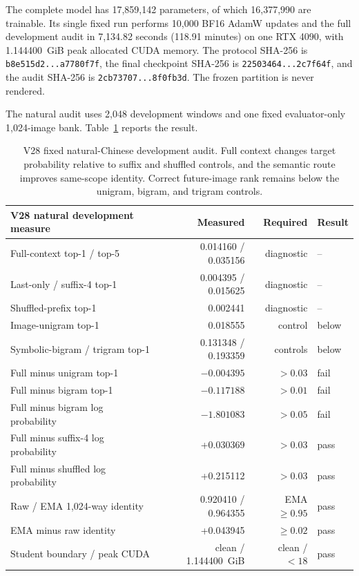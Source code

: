 \documentclass[11pt]{article}
\begin{document}
The complete model has 17,859,142 parameters, of which 16,377,990 are
trainable. Its single fixed run performs 10,000 BF16 AdamW updates and the full
development audit in 7,134.82 seconds (118.91 minutes) on one RTX 4090, with
1.144400~GiB peak allocated CUDA memory. The protocol SHA-256 is
\texttt{b8e515d2...a7780f7f}, the final checkpoint SHA-256 is
\texttt{22503464...2c7f64f}, and the audit SHA-256 is
\texttt{2cb73707...8f0fb3d}. The frozen partition is never rendered.

The natural audit uses 2,048 development windows and one fixed evaluator-only
1,024-image bank. Table~\ref{tab:v28natural} reports the result.

\begin{table}[h!]
\centering
\small
\begin{tabular}{lrrl}
\toprule
V28 natural development measure & Measured & Required & Result \\
\midrule
Full-context top-1 / top-5 & 0.014160 / 0.035156 & diagnostic & -- \\
Last-only / suffix-4 top-1 & 0.004395 / 0.015625 & diagnostic & -- \\
Shuffled-prefix top-1 & 0.002441 & diagnostic & -- \\
Image-unigram top-1 & 0.018555 & control & below \\
Symbolic-bigram / trigram top-1 & 0.131348 / 0.193359 & controls & below \\
Full minus unigram top-1 & $-0.004395$ & $>0.03$ & fail \\
Full minus bigram top-1 & $-0.117188$ & $>0.01$ & fail \\
Full minus bigram log probability & $-1.801083$ & $>0.05$ & fail \\
Full minus suffix-4 log probability & +0.030369 & $>0.03$ & pass \\
Full minus shuffled log probability & +0.215112 & $>0.03$ & pass \\
Raw / EMA 1,024-way identity & 0.920410 / 0.964355 & EMA $\geq0.95$ & pass \\
EMA minus raw identity & +0.043945 & $\geq0.02$ & pass \\
Student boundary / peak CUDA & clean / 1.144400~GiB & clean / $<18$ & pass \\
\bottomrule
\end{tabular}
\caption{V28 fixed natural-Chinese development audit. Full context changes
target probability relative to suffix and shuffled controls, and the semantic
route improves same-scope identity. Correct future-image rank remains below
the unigram, bigram, and trigram controls.}
\label{tab:v28natural}
\end{table}
\end{document}
